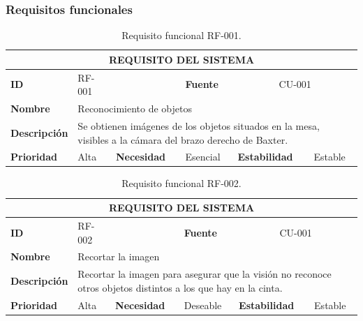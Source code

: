 \subsubsection{Requisitos funcionales}
\begin{table}[H]
	\centering
	\begin{tabular}{|p{2cm} | p{1.5cm} | p{2cm} | p{1.7cm} | p{2cm} | p{2cm} |}
		\hline
		\multicolumn{6}{|c|}{\textbf{REQUISITO DEL SISTEMA}} \\ 
		\hline
		\textbf{ID} & RF-001 & & \textbf{Fuente} & \multicolumn{2}{c|}{CU-001} \\
		\hline
		\textbf{Nombre} & \multicolumn{5}{l|}{Reconocimiento de objetos} \\
		\hline
		\textbf{Descripción} & \multicolumn{5}{l|}{\parbox{30em}{Se obtienen imágenes de los objetos situados en la mesa, visibles a la cámara del brazo derecho de Baxter.}} \\
		\hline
		\textbf{Prioridad} & Alta & \textbf{Necesidad} & Esencial & \textbf{Estabilidad} & Estable \\
		\hline		
	\end{tabular}
	\caption{Requisito funcional RF-001.}
	\label{cuad:RF-001}
\end{table}

\begin{table}[H]
	\centering
	\begin{tabular}{|p{2cm} | p{1.5cm} | p{2cm} | p{1.7cm} | p{2cm} | p{2cm} |}
		\hline
		\multicolumn{6}{|c|}{\textbf{REQUISITO DEL SISTEMA}} \\ 
		\hline
		\textbf{ID} & RF-002 & & \textbf{Fuente} & \multicolumn{2}{c|}{CU-001} \\
		\hline
		\textbf{Nombre} & \multicolumn{5}{l|}{Recortar la imagen} \\
		\hline
		\textbf{Descripción} & \multicolumn{5}{l|}{\parbox{30em}{Recortar la imagen para asegurar que la visión no reconoce otros objetos distintos a los que hay en la cinta.}} \\
		\hline
		\textbf{Prioridad} & Alta & \textbf{Necesidad} & Deseable & \textbf{Estabilidad} & Estable \\
		\hline		
	\end{tabular}
	\caption{Requisito funcional RF-002.}
	\label{cuad:RF-002}
\end{table}

